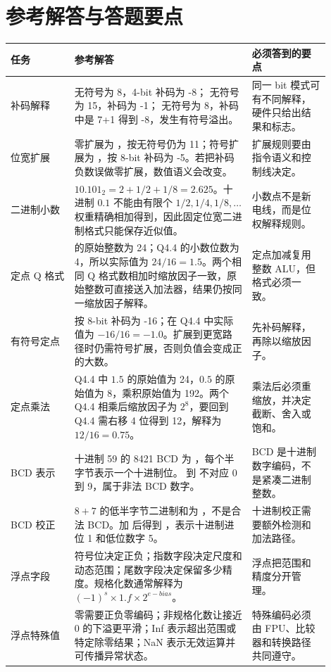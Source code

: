 \section*{参考解答与答题要点}

\begin{longtable}{L{0.18\linewidth}L{0.5\linewidth}L{0.22\linewidth}}
\toprule
任务 & 参考解答 & 必须答到的要点 \\
\midrule
补码解释 &  无符号为 8，4-bit 补码为 -8； 无符号为 15，补码为 -1； 无符号为 8，补码中是 7+1 得到 -8，发生有符号溢出。 & 同一 bit 模式可有不同解释，硬件只给出结果和标志。 \\
位宽扩展 &  零扩展为 ，按无符号仍为 11；符号扩展为 ，按 8-bit 补码为 -5。若把补码负数误做零扩展，数值语义会改变。 & 扩展规则要由指令语义和控制线决定。 \\
二进制小数 & $10.101_2=2+1/2+1/8=2.625$。十进制 $0.1$ 不能由有限个 $1/2,1/4,1/8,\ldots$ 权重精确相加得到，因此固定位宽二进制格式只能保存近似值。 & 小数点不是新电线，而是位权解释规则。 \\
定点 Q 格式 &  的原始整数为 24；Q4.4 的小数位数为 4，所以实际值为 $24/16=1.5$。两个相同 Q 格式数相加时缩放因子一致，原始整数可直接送入加法器，结果仍按同一缩放因子解释。 & 定点加减复用整数 ALU，但格式必须一致。 \\
有符号定点 &  按 8-bit 补码为 -16；在 Q4.4 中实际值为 $-16/16=-1.0$。扩展到更宽路径时仍需符号扩展，否则负值会变成正的大数。 & 先补码解释，再除以缩放因子。 \\
定点乘法 & Q4.4 中 $1.5$ 的原始值为 24，$0.5$ 的原始值为 8，乘积原始值为 192。两个 Q4.4 相乘后缩放因子为 $2^8$，要回到 Q4.4 需右移 4 位得到 12，解释为 $12/16=0.75$。 & 乘法后必须重缩放，并决定截断、舍入或饱和。 \\
BCD 表示 & 十进制 59 的 8421 BCD 为 ，每个半字节表示一个十进制位。 到  不对应 0 到 9，属于非法 BCD 数字。 & BCD 是十进制数字编码，不是紧凑二进制整数。 \\
BCD 校正 & $8+7$ 的低半字节二进制和为 ，不是合法 BCD。加  后得到 ，表示十进制进位 1 和低位数字 5。 & 十进制校正需要额外检测和加法路径。 \\
浮点字段 & 符号位决定正负；指数字段决定尺度和动态范围；尾数字段决定保留多少精度。规格化数通常解释为 $(-1)^s \times 1.f \times 2^{e-bias}$。 & 浮点把范围和精度分开管理。 \\
浮点特殊值 & 零需要正负零编码；非规格化数让接近 0 的下溢更平滑；Inf 表示超出范围或特定除零结果；NaN 表示无效运算并可传播异常状态。 & 特殊编码必须由 FPU、比较器和转换路径共同遵守。 \\

\end{longtable}
